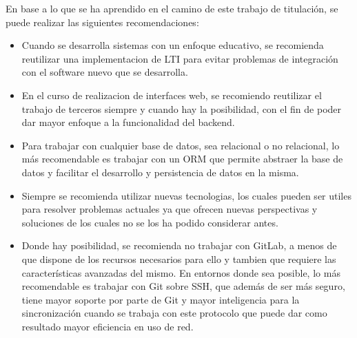 En base a lo que se ha aprendido en el camino de este trabajo de titulación, se puede realizar las siguientes recomendaciones:

\begin{itemize}
  \item Cuando se desarrolla sistemas con un enfoque educativo, se recomienda reutilizar una implementacion de LTI para evitar problemas de integración con el software nuevo que se desarrolla.
  \item En el curso de realizacion de interfaces web, se recomiendo reutilizar el trabajo de terceros siempre y cuando hay la posibilidad, con el fin de poder dar mayor enfoque a la funcionalidad del backend.
  \item Para trabajar con cualquier base de datos, sea relacional o no relacional, lo más recomendable es trabajar con un ORM que permite abstraer la base de datos y facilitar el desarrollo y persistencia de datos en la misma.
  \item Siempre se recomienda utilizar nuevas tecnologias, los cuales pueden ser utiles para resolver problemas actuales ya que ofrecen nuevas perspectivas y soluciones de los cuales no se los ha podido considerar antes.
  \item Donde hay posibilidad, se recomienda no trabajar con GitLab, a menos de que dispone de los recursos necesarios para ello y tambien que requiere las características avanzadas del mismo. En entornos donde sea posible, lo más recomendable es trabajar con Git sobre SSH, que además de ser más seguro, tiene mayor soporte por parte de Git y mayor inteligencia para la sincronización cuando se trabaja con este protocolo que puede dar como resultado mayor eficiencia en uso de red.
\end{itemize}


